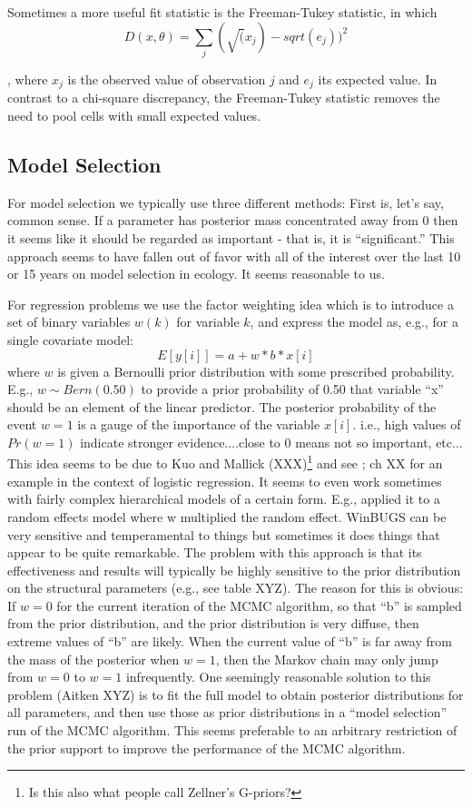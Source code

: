 Sometimes a more useful fit statistic is the Freeman-Tukey statistic, in which 
\[
D(x,\theta) = \sum_{j} ( \sqrt(x_{j}) - sqrt(e_{j}) )^2
\]

\citep{brooks_etal:2000}, where $x_{j}$ is the observed value of observation  $j$ and $e_{j}$ its expected value. In contrast to a chi-square discrepancy, the Freeman-Tukey statistic removes the need to pool cells with small expected values.


\subsection{Model Selection }

 For model selection we typically use three different methods: First is, let's say, common sense. If a parameter has posterior mass concentrated away from 0 then it seems like it should be regarded as important - that is, it is ``significant.''  This approach seems to have fallen out of favor with all of the interest over the last 10 or 15 years on model selection in ecology. It seems reasonable to us. 


For regression problems we use the factor weighting idea which is to introduce a set of binary variables $w(k)$ for variable $k$, and express the model as, e.g., for a single covariate model:
 \[
 E[y[i]] = a + w*b*x[i]
\]
where $w$ is given a Bernoulli prior distribution with some prescribed probability. E.g., $w \sim Bern(0.50)$ to provide a prior probability of 0.50 that variable ``x'' should be an element of the linear predictor. The posterior probability of the event $w=1$ is a gauge of the importance of the variable $x[i]$. i.e.,  high values of $Pr(w=1)$ indicate stronger evidence....close to 0 means not so important, etc...
 This idea seems to be due to Kuo and Mallick (XXX)\footnote{ Is this
   also what people call Zellner's G-priors?} and see
 \citet{royle_dorazio:2008}; ch XX for an example in the context of
 logistic regression. It seems to even work sometimes with fairly
 complex hierarchical models of a certain form. E.g.,
 \citet{royle:2008} applied it to a random effects model where w
 multiplied the random effect. WinBUGS can be very sensitive and
 temperamental to things but sometimes it does things that appear to
 be quite remarkable. The problem with this approach is that its
 effectiveness and results will typically be highly sensitive to the
 prior distribution on the structural parameters (e.g., see
 \citet{royle_dorazio:2008} table XYZ). The reason for this is obvious: If $w = 0$ for the current iteration of the MCMC algorithm, so that ``b'' is sampled from the prior distribution, and the prior distribution is very diffuse, then extreme values of ``b'' are likely. When the current value of ``b'' is far away from the mass of the posterior when $w=1$, then the Markov chain may only jump from $w=0$ to $w=1$ infrequently.  One seemingly reasonable solution to this problem (Aitken XYZ) is to fit the full model to obtain posterior distributions for all parameters, and then use those as prior distributions in a ``model selection'' run of the MCMC algorithm.  This seems preferable to an arbitrary restriction of the prior support to improve the performance of the MCMC algorithm. 

